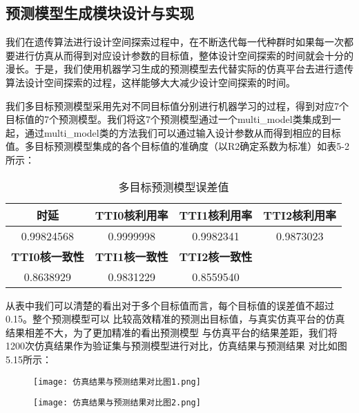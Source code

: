 \subsection{预测模型生成模块设计与实现}

我们在遗传算法进行设计空间探索过程中，在不断迭代每一代种群时如果每一次都要进行仿真从而得到对应设计参数的目标值，整体设计空间探索的时间就会十分的漫长。于是，我们使用机器学习生成的预测模型去代替实际的仿真平台去进行遗传算法设计空间探索的过程，这样能够大大减少设计空间探索的时间。

我们多目标预测模型采用先对不同目标值分别进行机器学习的过程，得到对应7个目标值的7个预测模型。我们将这7个预测模型通过一个multi\_model类集成到一起，通过multi\_model类的方法我们可以通过输入设计参数从而得到相应的目标值。多目标预测模型集成的各个目标值的准确度（以R2确定系数为标准）如表5-2所示：

\begin{table}[!h]
    \centering\normalsize
    \caption{多目标预测模型误差值}
    \begin{tabular}{|c|c|c|c|}
    \hline
    \textbf{时延}       & \textbf{TTI0核利用率} & \textbf{TTI1核利用率} & \textbf{TTI2核利用率} \\ \hline
    0.99824568        & 0.9999998         & 0.9982341         & 0.9873023         \\ \hline
    \textbf{TTI0核一致性} & \textbf{TTI1核一致性} & \textbf{TTI2核一致性} & \textbf{}         \\ \hline
    0.8638929         & 0.9831229         & 0.8559540         &                   \\ \hline
    \end{tabular}
    \end{table}

从表中我们可以清楚的看出对于多个目标值而言，每个目标值的误差值不超过0.15。整个预测模型可以
比较高效精准的预测出目标值，与真实仿真平台的仿真结果相差不大，为了更加精准的看出预测模型
与仿真平台的结果差距，我们将1200次仿真结果作为验证集与预测模型进行对比，仿真结果与预测结果
对比如图5.15所示：

\begin{figure}[!h]
    \centering
    \texttt{[image: 仿真结果与预测结果对比图1.png]}
\end{figure}

\begin{figure}[!h]
    \centering
    \texttt{[image: 仿真结果与预测结果对比图2.png]}
\end{figure}

